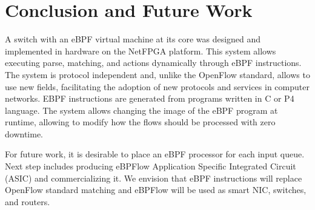 \section{Conclusion and Future Work}
\label{sec:conclusion}

A switch with an eBPF virtual machine at its core was designed and implemented in hardware on the NetFPGA platform. 
This system allows executing parse, matching, and actions dynamically through eBPF instructions.
The system is protocol independent and, unlike the OpenFlow standard, allows to use new fields, facilitating the adoption of new protocols and services in computer networks.
EBPF instructions are generated from programs written in C or P4 language. 
The system allows changing the image of the eBPF program at runtime, allowing to modify how the flows should be processed with zero downtime.

For future work, it is desirable to place an eBPF processor for each input queue. Next step includes producing eBPFlow Application Specific Integrated Circuit (ASIC) and commercializing it.
We envision that eBPF instructions will replace OpenFlow standard matching and eBPFlow will be used as smart NIC, switches, and routers.
